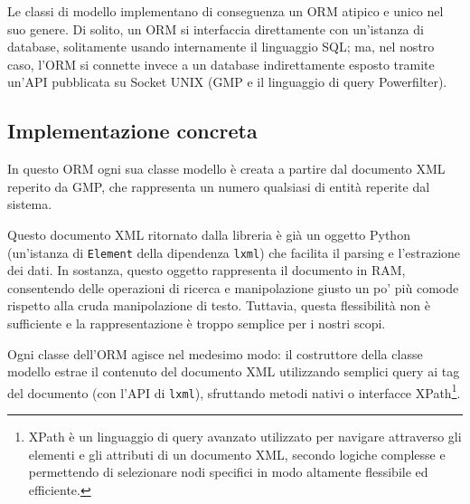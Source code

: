 Le classi di modello implementano di conseguenza un ORM atipico e unico nel suo genere. Di solito, un ORM si interfaccia direttamente con un'istanza di database, solitamente usando internamente il linguaggio SQL; ma, nel nostro caso, l'ORM si connette invece a un database indirettamente esposto tramite un'API pubblicata su Socket UNIX (GMP e il linguaggio di query Powerfilter).

\subsection{Implementazione concreta}
In questo ORM ogni sua classe modello è creata a partire dal documento XML reperito da GMP, che rappresenta un numero qualsiasi di entità reperite dal sistema.

Questo documento XML ritornato dalla libreria è già un oggetto Python (un'istanza di \texttt{Element} della dipendenza \texttt{lxml}) che facilita il parsing e l'estrazione dei dati. In sostanza, questo oggetto rappresenta il documento in RAM, consentendo delle operazioni di ricerca e manipolazione giusto un po' più comode rispetto alla cruda manipolazione di testo. Tuttavia, questa flessibilità non è sufficiente e la rappresentazione è troppo semplice per i nostri scopi.

Ogni classe dell'ORM agisce nel medesimo modo: il costruttore della classe modello estrae il contenuto del documento XML utilizzando semplici query ai tag del documento (con l'API di \texttt{lxml}), sfruttando metodi nativi o interfacce XPath\footnote{XPath è un linguaggio di query avanzato utilizzato per navigare attraverso gli elementi e gli attributi di un documento XML, secondo logiche complesse e permettendo di selezionare nodi specifici in modo altamente flessibile ed efficiente.}.

